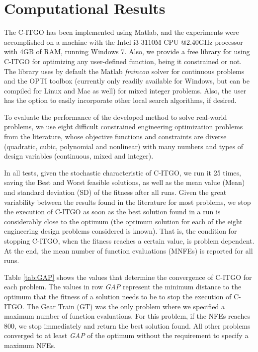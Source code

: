 \section{Computational Results} \label{sec:Results}

The C-ITGO has been implemented using Matlab, and the experiments were accomplished on a machine with the Intel i3-3110M CPU @2.40GHz processor with 4GB of RAM, running Windows 7. Also, we provide a free library for using C-ITGO for optimizing any user-defined function, being it constrained or not. The library uses by default the Matlab \textit{fmincon} solver for continuous problems and the OPTI toolbox (currently only readily available for Windows, but can be compiled for Linux and Mac as well) for mixed integer problems. Also, the user has the option to easily incorporate other local search algorithms, if desired.


To evaluate the performance of the developed method to solve real-world problems, we use eight difficult constrained engineering optimization problems from the literature, whose objective functions and constraints are diverse (quadratic, cubic, polynomial and nonlinear) with many numbers and types of design variables (continuous, mixed and integer). 

In all tests, given the stochastic characteristic of C-ITGO, we run it 25 times, saving the Best and Worst feasible solutions, as well as the mean value (Mean) and standard deviation (SD) of the fitness after all runs. Given the great variability between the results found in the literature for most problems, we stop the execution of C-ITGO as soon as the best solution found in a run is considerably close to the optimum (the optimum solution for each of the eight engineering design problems considered is known). That is, the condition for stopping C-ITGO, when the fitness reaches a certain value, is problem dependent. At the end, the mean number of function evaluations (MNFEs) is reported for all runs.

Table \ref{tab:GAP} shows the values that determine the convergence of C-ITGO for each problem. The values in row \textit{GAP} represent the minimum distance to the optimum that the fitness of a solution needs to be to stop the execution of C-ITGO. The Gear Train (GT) was the only problem where we specified a maximum number of function evaluations. For this problem, if the NFEs reaches 800, we stop immediately and return the best solution found. All other problems converged to at least \textit{GAP} of the optimum without the requirement to specify a maximum NFEs.


